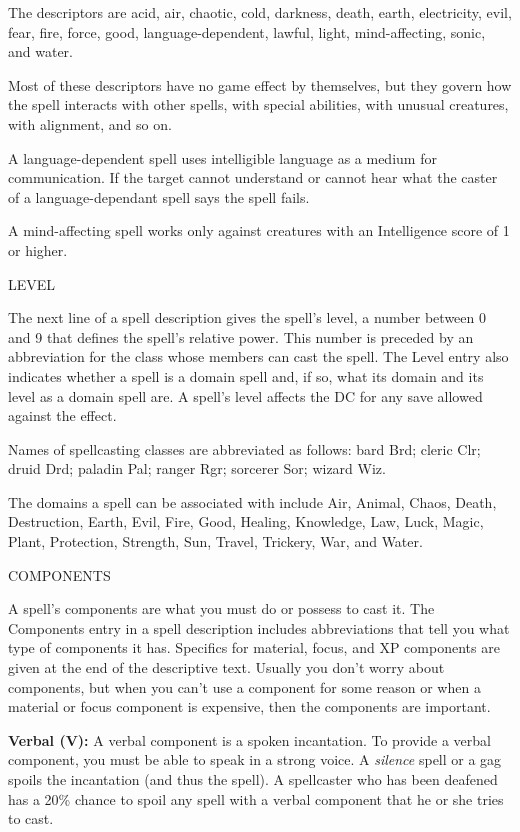 \documentclass{article}
\begin{document}
The descriptors are acid, air, chaotic, cold, darkness, death, earth, electricity, 
evil, fear, fire, force, good, language-dependent, lawful, light, mind-affecting, 
sonic, and water.

Most of these descriptors have no game effect by themselves, but they govern how 
the spell interacts with other spells, with special abilities, with unusual creatures, 
with alignment, and so on.

A language-dependent spell uses intelligible language as a medium for communication. 
If the target cannot understand or cannot hear what the caster of a language-dependant 
spell says the spell fails.

A mind-affecting spell works only against creatures with an Intelligence score 
of 1 or higher.

\vspace{12pt}
LEVEL

The next line of a spell description gives the spell's level, a number between 
0 and 9 that defines the spell's relative power. This number is preceded by an 
abbreviation for the class whose members can cast the spell. The Level entry also 
indicates whether a spell is a domain spell and, if so, what its domain and its 
level as a domain spell are. A spell's level affects the DC for any save allowed 
against the effect.

Names of spellcasting classes are abbreviated as follows: bard Brd; cleric Clr; 
druid Drd; paladin Pal; ranger Rgr; sorcerer Sor; wizard Wiz.

The domains a spell can be associated with include Air, Animal, Chaos, Death, Destruction, 
Earth, Evil, Fire, Good, Healing, Knowledge, Law, Luck, Magic, Plant, Protection, 
Strength, Sun, Travel, Trickery, War, and Water.

\vspace{12pt}
COMPONENTS

A spell's components are what you must do or possess to cast it. The Components 
entry in a spell description includes abbreviations that tell you what type of 
components it has. Specifics for material, focus, and XP components are given at 
the end of the descriptive text. Usually you don't worry about components, but 
when you can't use a component for some reason or when a material or focus component 
is expensive, then the components are important.

\textbf{Verbal (V):} A verbal component is a spoken incantation. To provide a verbal 
component, you must be able to speak in a strong voice. A \textit{silence }spell 
or a gag spoils the incantation (and thus the spell). A spellcaster who has been 
deafened has a 20\% chance to spoil any spell with a verbal component that he or 
she tries to cast.
\end{document}
